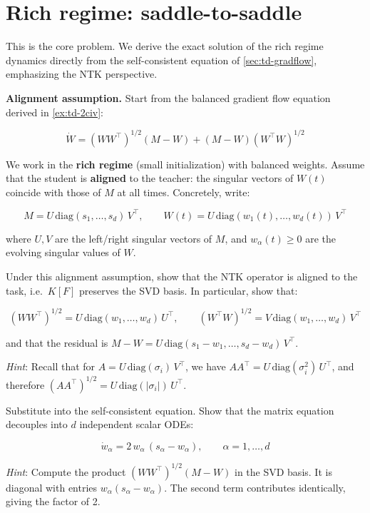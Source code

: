 \documentclass[11pt]{article}
\begin{document}
\section{Rich regime: saddle-to-saddle}
\label{sec:td-rich}

This is the core problem. We derive the exact solution of the rich
regime dynamics directly from the self-consistent equation of \cref{sec:td-gradflow},
emphasizing the NTK perspective.

\textbf{Alignment assumption.} Start from the balanced
gradient flow equation derived in \cref{ex:td-2civ}:

\[\dot{W} = (WW^\top)^{1/2}(M - W) + (M - W)(W^\top W)^{1/2}\]

We work in the \textbf{rich regime} (small initialization) with balanced
weights. Assume that the student is \textbf{aligned} to the teacher: the
singular vectors of \(W(t)\) coincide with those of \(M\) at all times.
Concretely, write:

\[M = U\,\text{diag}(s_1, \ldots, s_d)\,V^\top, \qquad W(t) = U\,\text{diag}(w_1(t), \ldots, w_d(t))\,V^\top\]

where \(U, V\) are the left/right singular vectors of \(M\), and
\(w_\alpha(t) \geq 0\) are the evolving singular values of \(W\).

\begin{exercise}
\label{ex:td-3ai}
Under this alignment assumption, show that the NTK
operator is aligned to the task, i.e.~\(K[F]\) preserves the SVD basis.
In particular, show that:

\[(WW^\top)^{1/2} = U\,\text{diag}(w_1, \ldots, w_d)\,U^\top, \qquad (W^\top W)^{1/2} = V\,\text{diag}(w_1, \ldots, w_d)\,V^\top\]

and that the residual is
\(M - W = U\,\text{diag}(s_1 - w_1, \ldots, s_d - w_d)\,V^\top\).

\emph{Hint}: Recall that for \(A = U\,\text{diag}(\sigma_i)\,V^\top\),
we have \(AA^\top = U\,\text{diag}(\sigma_i^2)\,U^\top\), and therefore
\((AA^\top)^{1/2} = U\,\text{diag}(|\sigma_i|)\,U^\top\).
\end{exercise}


\begin{exercise}
\label{ex:td-3aii}
Substitute into the self-consistent equation. Show that
the matrix equation decouples into \(d\) independent scalar ODEs:

\[\dot{w}_\alpha = 2\,w_\alpha\,(s_\alpha - w_\alpha), \qquad \alpha = 1, \ldots, d\]

\emph{Hint}: Compute the product \((WW^\top)^{1/2}(M - W)\) in the SVD
basis. It is diagonal with entries \(w_\alpha(s_\alpha - w_\alpha)\).
The second term contributes identically, giving the factor of 2.
\end{exercise}
\end{document}
